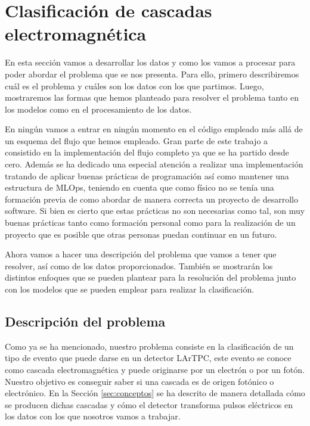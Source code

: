\documentclass[a4paper,12pt,twoside,titlepage]{article}
\newcommand{\red}[1]{\textcolor{red}{#1}}
\begin{document}
\section{Clasificación de cascadas electromagnética}


En esta sección vamos a desarrollar los datos y como los vamos a procesar para poder abordar el problema que se nos presenta. Para ello, primero describiremos cuál es el problema y cuáles son los datos con los que partimos. Luego, mostraremos las formas que hemos planteado para resolver el problema tanto en los modelos como en el procesamiento de los datos.

En ningún vamos a entrar en ningún momento en el código empleado más allá de un esquema del flujo que hemos empleado. Gran parte de este trabajo a consistido en la implementación del flujo completo ya que se ha partido desde cero. Además se ha dedicado una especial atención a realizar una implementación tratando de aplicar buenas prácticas de programación \cite{clean} así como mantener una estructura de MLOps, teniendo en cuenta que como físico no se tenía una formación previa de como abordar de manera correcta un proyecto de desarrollo software. Si bien es cierto que estas prácticas no son necesarias como tal, son muy buenas prácticas tanto como formación personal como para la realización de un proyecto que es posible que otras personas puedan continuar en un futuro.

Ahora vamos a hacer una descripción del problema que vamos a tener que resolver, así como de los datos proporcionados. También se mostrarán los distintos enfoques que se pueden plantear para la resolución del problema junto con los modelos que se pueden emplear para realizar la clasificación.
\subsection{Descripción del problema}

Como ya se ha mencionado, nuestro problema consiste en la clasificación de un tipo de evento que puede darse en un detector LArTPC, este evento se conoce como cascada electromagnética y puede originarse por un electrón o por un fotón. Nuestro objetivo es conseguir saber si una cascada es de origen fotónico o electrónico. En la Sección \ref{sec:conceptos} se ha descrito de manera detallada cómo se producen dichas cascadas y cómo el detector transforma pulsos eléctricos en los datos con los que nosotros vamos a trabajar.
\end{document}
